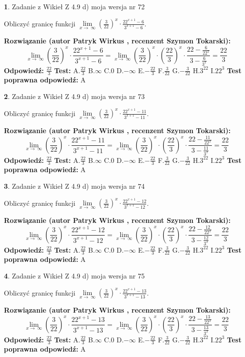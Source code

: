 \documentclass[12pt, a4paper]{article}
\theoremstyle{definition} %
\newtheorem{zad}{}
\newcommand{\zadStart}[1]{\begin{zad}#1\newline}
\newcommand{\zadStop}{\end{zad}}
\newcommand{\rozwStart}[2]{\noindent \textbf{Rozwiązanie (autor #1 , recenzent #2): }\newline}
\newcommand{\rozwStop}{\newline}
\newcommand{\odpStart}{\noindent \textbf{Odpowiedź:}\newline}
\newcommand{\odpStop}{\newline}
\newcommand{\testStart}{\noindent \textbf{Test:}\newline}
\newcommand{\testStop}{\newline}
\newcommand{\kluczStart}{\noindent \textbf{Test poprawna odpowiedź:}\newline}
\newcommand{\kluczStop}{\newline}
\begin{document}
\zadStart{Zadanie z Wikieł Z 4.9 d) moja wersja nr 72}


Obliczyć granicę funkcji  $\lim\limits_{x\to\ \infty}(\frac{3}{22})^{x}\cdot\frac{22^{x+1}-6}{3^{x+1}-6}$.
\zadStop
\rozwStart{Patryk Wirkus}{Szymon Tokarski}
$$\lim\limits_{x\to\ \infty}(\frac{3}{22})^{x}\cdot\frac{22^{x+1}-6}{3^{x+1}-6}=\lim\limits_{x\to\ \infty}(\frac{3}{22})^{x}\cdot(\frac{22}{3})^{x} \cdot \frac{22-\frac{6}{22^{x}}}{3-\frac{6}{3^{x}}} = \frac{22}{3}$$
\rozwStop
\odpStart
$\frac{22}{3}$
\odpStop
\testStart
A.$\frac{22}{3}$ B.$\infty$ C.$0$ D.$-\infty$ E.$-\frac{22}{3}$
F.$\frac{3}{22}$ G.$-\frac{3}{22}$
H.$3^{22}$
I.$22^{3}$
\testStop
\kluczStart
A
\kluczStop



\zadStart{Zadanie z Wikieł Z 4.9 d) moja wersja nr 73}


Obliczyć granicę funkcji  $\lim\limits_{x\to\ \infty}(\frac{3}{22})^{x}\cdot\frac{22^{x+1}-11}{3^{x+1}-11}$.
\zadStop
\rozwStart{Patryk Wirkus}{Szymon Tokarski}
$$\lim\limits_{x\to\ \infty}(\frac{3}{22})^{x}\cdot\frac{22^{x+1}-11}{3^{x+1}-11}=\lim\limits_{x\to\ \infty}(\frac{3}{22})^{x}\cdot(\frac{22}{3})^{x} \cdot \frac{22-\frac{11}{22^{x}}}{3-\frac{11}{3^{x}}} = \frac{22}{3}$$
\rozwStop
\odpStart
$\frac{22}{3}$
\odpStop
\testStart
A.$\frac{22}{3}$ B.$\infty$ C.$0$ D.$-\infty$ E.$-\frac{22}{3}$
F.$\frac{3}{22}$ G.$-\frac{3}{22}$
H.$3^{22}$
I.$22^{3}$
\testStop
\kluczStart
A
\kluczStop



\zadStart{Zadanie z Wikieł Z 4.9 d) moja wersja nr 74}


Obliczyć granicę funkcji  $\lim\limits_{x\to\ \infty}(\frac{3}{22})^{x}\cdot\frac{22^{x+1}-12}{3^{x+1}-12}$.
\zadStop
\rozwStart{Patryk Wirkus}{Szymon Tokarski}
$$\lim\limits_{x\to\ \infty}(\frac{3}{22})^{x}\cdot\frac{22^{x+1}-12}{3^{x+1}-12}=\lim\limits_{x\to\ \infty}(\frac{3}{22})^{x}\cdot(\frac{22}{3})^{x} \cdot \frac{22-\frac{12}{22^{x}}}{3-\frac{12}{3^{x}}} = \frac{22}{3}$$
\rozwStop
\odpStart
$\frac{22}{3}$
\odpStop
\testStart
A.$\frac{22}{3}$ B.$\infty$ C.$0$ D.$-\infty$ E.$-\frac{22}{3}$
F.$\frac{3}{22}$ G.$-\frac{3}{22}$
H.$3^{22}$
I.$22^{3}$
\testStop
\kluczStart
A
\kluczStop



\zadStart{Zadanie z Wikieł Z 4.9 d) moja wersja nr 75}


Obliczyć granicę funkcji  $\lim\limits_{x\to\ \infty}(\frac{3}{22})^{x}\cdot\frac{22^{x+1}-13}{3^{x+1}-13}$.
\zadStop
\rozwStart{Patryk Wirkus}{Szymon Tokarski}
$$\lim\limits_{x\to\ \infty}(\frac{3}{22})^{x}\cdot\frac{22^{x+1}-13}{3^{x+1}-13}=\lim\limits_{x\to\ \infty}(\frac{3}{22})^{x}\cdot(\frac{22}{3})^{x} \cdot \frac{22-\frac{13}{22^{x}}}{3-\frac{13}{3^{x}}} = \frac{22}{3}$$
\rozwStop
\odpStart
$\frac{22}{3}$
\odpStop
\testStart
A.$\frac{22}{3}$ B.$\infty$ C.$0$ D.$-\infty$ E.$-\frac{22}{3}$
F.$\frac{3}{22}$ G.$-\frac{3}{22}$
H.$3^{22}$
I.$22^{3}$
\testStop
\kluczStart
A
\kluczStop
\end{document}

